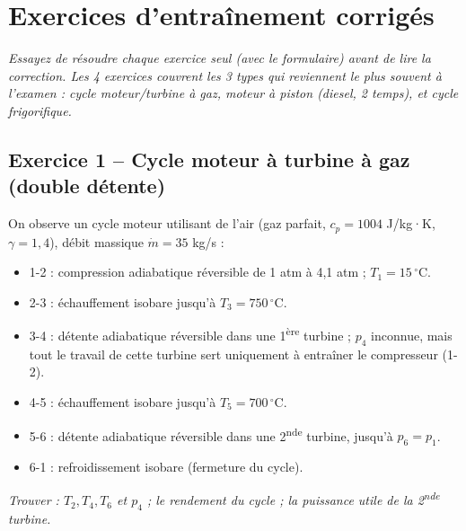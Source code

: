 \section{Exercices d'entraînement corrigés}

\noindent\textit{Essayez de résoudre chaque exercice seul (avec le formulaire) avant de lire la correction.
Les 4 exercices couvrent les 3 types qui reviennent le plus souvent à l'examen : cycle moteur/turbine à gaz,
moteur à piston (diesel, 2 temps), et cycle frigorifique.}

\subsection{Exercice 1 -- Cycle moteur à turbine à gaz (double détente)}

\begin{enonce}
On observe un cycle moteur utilisant de l'air (gaz parfait, $c_p=1004$ J/kg·K, $\gamma=1{,}4$), débit
massique $\dot m=35$ kg/s :
\begin{itemize}[leftmargin=1.4em,itemsep=1pt]
\item 1-2 : compression adiabatique réversible de 1 atm à 4,1 atm ; $T_1=15\,^\circ$C.
\item 2-3 : échauffement isobare jusqu'à $T_3=750\,^\circ$C.
\item 3-4 : détente adiabatique réversible dans une 1\textsuperscript{ère} turbine ; $p_4$ inconnue, mais
tout le travail de cette turbine sert uniquement à entraîner le compresseur (1-2).
\item 4-5 : échauffement isobare jusqu'à $T_5=700\,^\circ$C.
\item 5-6 : détente adiabatique réversible dans une 2\textsuperscript{nde} turbine, jusqu'à $p_6=p_1$.
\item 6-1 : refroidissement isobare (fermeture du cycle).
\end{itemize}
\emph{Trouver : $T_2,T_4,T_6$ et $p_4$ ; le rendement du cycle ; la puissance utile de la 2\textsuperscript{nde}
turbine.}
\end{enonce}

